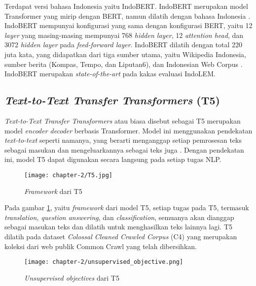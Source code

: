 Terdapat versi bahasa Indonesia yaitu IndoBERT. IndoBERT merupakan model Transformer yang mirip dengan BERT, namun dilatih dengan bahasa Indonesia \parencite{indolem}. IndoBERT mempunyai konfigurasi yang sama dengan konfigurasi BERT, yaitu 12 \textit{layer} yang masing-masing mempunyai 768 \textit{hidden layer}, 12 \textit{attention head}, dan 3072 \textit{hidden layer} pada \textit{feed-forward layer}. IndoBERT dilatih dengan total 220 juta kata, yang didapatkan dari tiga sumber utama, yaitu Wikipedia Indonesia, sumber berita (Kompas, Tempo, dan Liputan6), dan Indonesian Web Corpus \parencite{indolem}. IndoBERT merupakan \textit{state-of-the-art} pada kakas evaluasi IndoLEM.

\subsection{\textit{Text-to-Text Transfer Transformers} (T5)}

\textit{Text-to-Text Transfer Transformers} atau biasa disebut sebagai T5 merupakan model \textit{encoder decoder} berbasis Transformer. Model ini menggunakan pendekatan \textit{text-to-text} seperti namanya, yang berarti menganggap setiap pemrosesan teks sebagai masukan dan mengeluarkannya sebagai teks juga \parencite{T5}. Dengan pendekatan ini, model T5 dapat digunakan secara langsung pada setiap tugas NLP.

\begin{figure}[ht]
    \vspace{0.25cm}
    \centering
    \texttt{[image: chapter-2/T5.jpg]}
    \caption{\textit{Framework} dari T5 \parencite{T5}}
    \label{fig:T5}
\end{figure}

Pada gambar \ref{fig:T5}, yaitu \textit{framework} dari model T5, setiap tugas pada T5, termasuk \textit{translation, question answering}, dan \textit{classification}, semuanya akan dianggap sebagai masukan teks dan dilatih untuk menghasilkan teks lainnya lagi. T5 dilatih pada dataset \textit{Colossal Cleaned Crawled Corpus} (C4) yang merupakan koleksi dari web publik Common Crawl yang telah dibersihkan.

\begin{figure}[ht]
    \vspace{0.25cm}
    \centering
    \texttt{[image: chapter-2/unsupervised\_objective.png]}
    \caption{\textit{Unsupervised objectives} dari T5 \parencite{T5}}
    \label{fig:unsupervised-T5}
\end{figure}

